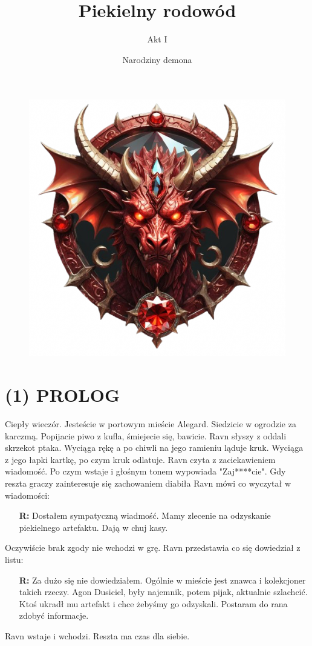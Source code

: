 \documentclass[14pt]{article}
\title{\textbf{Piekielny rodowód}}
\author{Akt I}
\date{Narodziny demona}
\begin{document}
\begin{figure}
    \centering
    \includegraphics[width=1\textwidth]{devil.png}
\end{figure}
\maketitle
\newpage
{}

\centering
\section*{(1) PROLOG}
\RaggedRight
Ciepły wieczór. Jesteście w portowym mieście Alegard. Siedzicie w ogrodzie za karczmą. Popijacie piwo z kufla, śmiejecie się, bawicie. Ravn słyszy z oddali skrzekot ptaka. Wyciąga rękę a po chiwli na jego ramieniu ląduje kruk. Wyciąga z jego łapki kartkę, po czym kruk odlatuje. Ravn czyta z zaciekawieniem wiadomość. Po czym wstaje i głośnym tonem wypowiada "Zaj****cie". Gdy reszta graczy zainteresuje się zachowaniem diabiła Ravn mówi co wyczytał w wiadomości:
\begin{itemize}
    \item[\textbf{R:}] Dostałem sympatyczną wiadmość. Mamy zlecenie na odzyskanie piekielnego artefaktu. Dają w chuj kasy.
\end{itemize}
Oczywiście brak zgody nie wchodzi w grę. Ravn przedstawia co się dowiedział z listu:
\begin{itemize}
    \item[\textbf{R:}] Za dużo się nie dowiedziałem. Ogólnie w mieście jest znawca i kolekcjoner takich rzeczy. Agon Dusiciel, były najemnik, potem pijak, aktualnie szlachcić. Ktoś ukradł mu artefakt i chce żebyśmy go odzyskali. Postaram do rana zdobyć informacje.
\end{itemize}
Ravn wstaje i wchodzi. Reszta ma czas dla siebie.
\newpage
\end{document}
